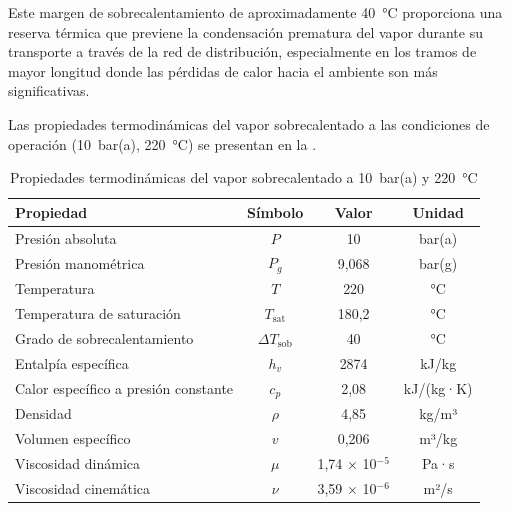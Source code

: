 \documentclass[12pt]{article}
\begin{document}
Este margen de sobrecalentamiento de aproximadamente 40~°C proporciona una reserva térmica que previene la condensación prematura del vapor durante su transporte a través de la red de distribución, especialmente en los tramos de mayor longitud donde las pérdidas de calor hacia el ambiente son más significativas.

Las propiedades termodinámicas del vapor sobrecalentado a las condiciones de operación (10~bar(a), 220~°C) se presentan en la .

\begin{table}[H]
	\centering
	\caption{Propiedades termodinámicas del vapor sobrecalentado a 10~bar(a) y 220~°C}
	\label{tab:propiedades-vapor-sobrecalentado}
	\begin{tabular}{lccc}
		\toprule
		\textbf{Propiedad}                   & \textbf{Símbolo}        & \textbf{Valor}   & \textbf{Unidad} \\
		\midrule
		Presión absoluta                     & $P$                     & 10               & bar(a)          \\
		Presión manométrica                  & $P_g$                   & 9,068            & bar(g)          \\
		Temperatura                          & $T$                     & 220              & °C              \\
		Temperatura de saturación            & $T_{\text{sat}}$        & 180,2            & °C              \\
		Grado de sobrecalentamiento          & $\Delta T_{\text{sob}}$ & 40               & °C              \\
		Entalpía específica                  & $h_v$                   & 2874             & kJ/kg           \\
		Calor específico a presión constante & $c_p$                   & 2,08             & kJ/(kg·K)       \\
		Densidad                             & $\rho$                  & 4,85             & kg/m³           \\
		Volumen específico                   & $v$                     & 0,206            & m³/kg           \\
		Viscosidad dinámica                  & $\mu$                   & 1,74 × 10$^{-5}$ & Pa·s            \\
		Viscosidad cinemática                & $\nu$                   & 3,59 × 10$^{-6}$ & m²/s            \\
		\bottomrule
	\end{tabular}
\end{table}
\end{document}
